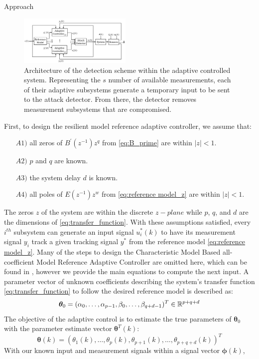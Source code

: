\begin{section}{Approach}
\begin{figure}[ht!]
\vspace{1pt}
\centering
\includegraphics[width=0.48\textwidth]{con_and_det.png}
\caption{Architecture of the detection scheme within the adaptive controlled system. Representing  the $s$ number of available measurements, each of their adaptive subsystems generate a temporary input to be sent to the attack detector. From there, the detector removes measurement subsystems that are compromised.}
\label{fig:det_arch}
\end{figure}

First, to design the resilient model reference adaptive controller, we assume that:
	\begin{enumerate}[leftmargin=3\parindent]
	\item[$A1)$] all zeros of $B^{'}(z^{-1})z^q$ from \eqref{eq:B_prime} are within $|z|<1$. 
	\item[$A2)$] $p$ and $q$ are known. 
	\item[$A3)$] the system delay $d$ is known.
	\item[$A4)$] all poles of $E(z^{-1})z^w$ from \eqref{eq:reference model_z} are within $|z|<1$.
	\end{enumerate}
The zeros $z$ of the system are within the discrete $z-plane$ while $p$, $q$, and $d$ are the dimensions of \eqref{eq:transfer_function}. With these assumptions satisfied, every $i^{th}$ subsystem can generate an input signal $u^*_i(k)$ to have its measurement signal $y_i$ track a given tracking signal $y^*$ from the reference model \eqref{eq:reference model_z}. Many of the steps to design the Characteristic Model Based all-coefficient Model Reference Adaptive Controller are omitted here, which can be found in \cite{tao2003adaptive,Goodwin1643720}, however we provide the main equations to compute the next input. A parameter vector of unknown coefficients describing the system's transfer function \eqref{eq:transfer_function} to follow the desired reference model is described as:
    \begin{equation}
	\bm{\theta}_0=(\alpha_0, \dots ,\alpha_{p-1},\beta_0, \dots ,\beta_{q+d-1})^T \in \mathbb{R}^{p+q+d}
	\end{equation}
The objective of the adaptive control is to estimate the true parameters of $\bm{\theta}_0$ with the parameter estimate vector $\bm{\theta}^T(k)$:
    \begin{equation}
    \bm{\theta}(k)=(\theta_1(k), \dots ,\theta_p(k),\theta_{p+1}(k), \dots ,\theta_{p+q+d}(k))^T
	\end{equation}
With our known input and measurement signals within a signal vector $\bm{\phi}(k)$,
    

\end{section}
